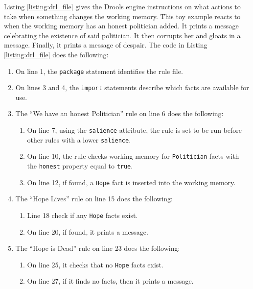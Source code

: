 Listing \ref{listing:drl_file} gives the Drools engine instructions on what actions to take when something changes the working memory.
This toy example reacts to when the working memory has an honest politician added. 
It prints a message celebrating the existence of said politician.
It then corrupts her and gloats in a message.
Finally, it prints a message of despair.
The code in Listing \ref{listing:drl_file} does the following: 
\begin{enumerate}[topsep=2pt,itemsep=2pt,partopsep=2pt, parsep=2pt]
    \setlength\itemsep{0em}
    \item On line 1, the \texttt{package} statement identifies the rule file.
    \item On lines 3 and 4, the \texttt{import} statements describe which facts are available for use.
    \item The ``We have an honest Politician'' rule on line 6 does the following:
    \begin{enumerate}[topsep=2pt,itemsep=2pt,partopsep=2pt, parsep=2pt]
        \setlength\itemsep{0em}
        \item On line 7, using the \texttt{salience} attribute, the rule is set to be run before other rules with a lower \texttt{salience}.
        \item On line 10, the rule checks working memory for \texttt{Politician} facts with the \texttt{honest} property equal to \texttt{true}.
        \item On line 12, if found, a \texttt{Hope} fact is inserted into the working memory.
    \end{enumerate}
    \item The ``Hope Lives'' rule on line 15 does the following:
    \begin{enumerate}[topsep=2pt,itemsep=2pt,partopsep=2pt, parsep=2pt]
        \setlength\itemsep{0em}
        \item Line 18 check if any \texttt{Hope} facts exist.
        \item On line 20, if found, it prints a message.
    \end{enumerate}
    \item The ``Hope is Dead'' rule on line 23 does the following:
    \begin{enumerate}[topsep=2pt,itemsep=2pt,partopsep=2pt, parsep=2pt]
        \setlength\itemsep{0em}
        \item On line 25, it checks that no \texttt{Hope} facts exist.
        \item On line 27, if it finds no facts, then it prints a message.  

\end{enumerate}
\end{enumerate}
